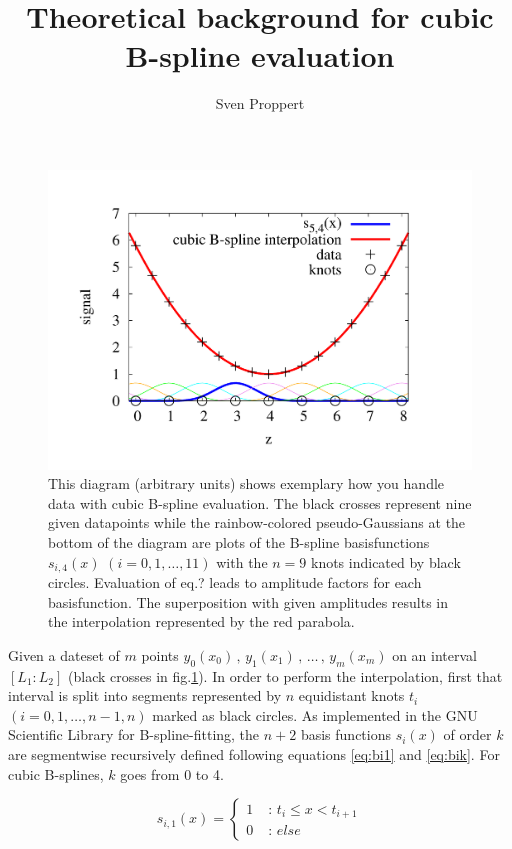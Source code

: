 \documentclass[a4paper]{article}
\title{Theoretical background for cubic B-spline evaluation}
\author{Sven Proppert}
\begin{document}
\maketitle

\begin{figure}%
\centering
\includegraphics[width=0.7\columnwidth]{spline-theory-example.pdf}%
\caption{This diagram (arbitrary units) shows exemplary how you handle data with cubic B-spline evaluation. The black crosses represent nine given datapoints while the rainbow-colored pseudo-Gaussians at the bottom of the diagram are plots of the B-spline basisfunctions $s_{i,4}(x)$ $(i=0,1,\hdots ,11)$ with the $n=9$ knots indicated by black circles. Evaluation of eq.? leads to amplitude factors for each basisfunction. The superposition with given amplitudes results in the interpolation represented by the red parabola.}%
\label{fig:ex}%
\end{figure}

Given a dateset of $m$ points $y_0(x_0)\, , \,y_1(x_1)\, , \, \hdots \, , \, y_m(x_m)$ on an interval $[L_1:L_2]$ (black crosses in fig.\ref{fig:ex}). In order to perform the interpolation, first that interval is split into segments represented by $n$ equidistant knots $t_{i}$ $\left(i=0,1,\hdots ,n-1,n\right)$ marked as black circles.
As implemented in the GNU Scientific Library for B-spline-fitting, the $n+2$ basis functions $s_{i}(x)$ of order $k$ are segmentwise recursively defined following equations \ref{eq:bi1} and \ref{eq:bik}. For cubic B-splines, $k$ goes from 0 to 4.

\begin{equation}
s_{i,1}(x) = \left\{\begin{array}{ll}
                  1\; 	&:\, t_i \leq x < t_{i+1}\\ 
                  0\;		&:\, else
                  \end{array}\right.
\label{eq:bi1}
\end{equation}
\end{document}

